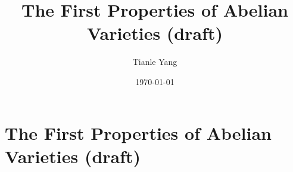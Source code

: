 \documentclass{noteformyself}
\title{The First Properties of Abelian Varieties (draft)}
\author{Tianle Yang}
\date{\today}
\begin{document}
    \maketitle

    \section{The First Properties of Abelian Varieties (draft)}

    

\end{document}
